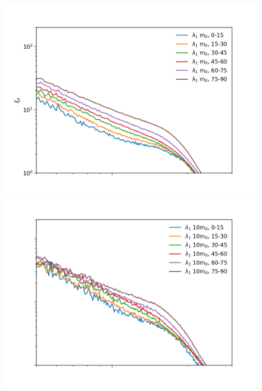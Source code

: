 \documentclass[a4paper,11pt]{article}
\begin{document}
\begin{figure}[!htb]
  \includegraphics[trim={1cm 0 0 0}, scale=0.57]{aniso_single_light_7_l1.png}
\endminipage\hfill
{}
  \includegraphics[trim={1cm 0 0 0},scale=0.57]{aniso_single_mid_7_l1.png}
\endminipage\hfill


\end{figure}
\end{document}
